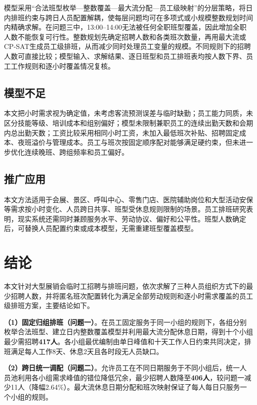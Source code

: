 \documentclass[withoutpreface,bwprint]{cumcmthesis}
\begin{document}
模型采用``合法班型枚举---整数覆盖---最大流分配---员工级映射''的分层策略，将日内排班约束与跨日人员配置解耦，使每层问题均可在多项式或小规模整数规划时间内精确求解。在问题三中，13:00--14:00无法被任何全职班型覆盖，因此增加全职人数不能恢复可行性。整数规划先确定招聘人数和各类班次数量，再用最大流或CP-SAT生成员工级排班，从而减少同时处理员工变量的规模。不同规则下的招聘人数可直接比较；模型输入、求解结果、逐日班型和员工排班表均按人数下界、员工工作规则和逐小时覆盖情况复核。

\subsection{模型不足}

本文把小时需求视为确定值，未考虑客流预测误差与临时缺勤；员工能力同质，未区分技能等级、培训成本和组别偏好；模型未限制兼职员工的连续出勤天数和会期内总出勤天数；工资比较采用相同小时工资，未加入最低班次补贴、招聘固定成本、夜班溢价与管理成本。员工与班次按固定顺序配对能够满足硬约束，但未进一步优化连续晚班、跨组频率和员工偏好。

\subsection{推广应用}

本文方法适用于会展、景区、呼叫中心、零售门店、医院辅助岗位和大型活动安保等需求按小时变化、人员跨日共享、班型受休息规则限制的场景。员工排班研究表明，现实系统还需同时兼顾服务水平、劳动协议、偏好和公平性\cite{ernst2004}。班型人数确定后，可替换人员配置约束或成本模型，无需重建班型覆盖模型。

\section{结论}

本文针对大型展销会临时工招聘与排班问题，依次求解了三种人员组织方式下的最少招聘人数，并将匿名班次配置转化为满足全部劳动规则和逐小时需求覆盖的员工级排班方案，主要结论如下。

\textbf{（1）固定归组排班（问题一）}。在员工固定服务于同一小组的规则下，各组分别枚举合法班型、建立日内整数覆盖模型并利用最大流分配休息日期，得到十个小组最少需招聘\textbf{417人}。各小组最优编制由单日峰值和十天工作人日约束共同决定，排班满足每人工作8天、休息2天且各时段无人员缺口。

\textbf{（2）跨日统一调配（问题二）}。允许员工在不同日期服务于不同小组后，统一人员池利用各小组需求峰值的错位降低冗余，最少招聘人数降至\textbf{406人}，较问题一减少11人（降幅2.64\%）。最大流休息日期分配和班次映射保证了每人每日只服务一个小组的规则。
\end{document}
